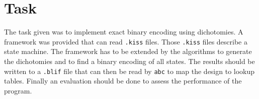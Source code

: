 \section{Task}

The task given was to implement exact binary encoding using dichotomies. A framework was provided that can read \texttt{.kiss} files. Those \texttt{.kiss} files describe a state machine. The framework has to be extended by the algorithms to generate the dichotomies and to find a binary encoding of all states. The results should be written to a \texttt{.blif} file that can then be read by \texttt{abc} to map the design to lookup tables. Finally an evaluation should be done to assess the performance of the program.